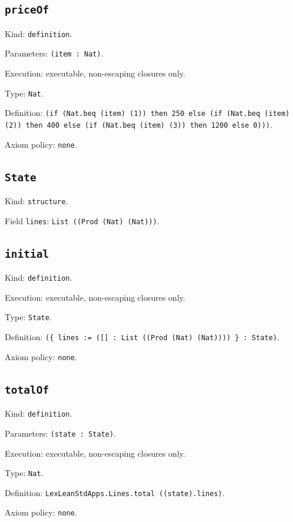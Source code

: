 \documentclass[11pt]{article}
\begin{document}
\subsection*{\texttt{priceOf}}
\noindent Kind: \texttt{definition}.\par
\noindent Parameters: \texttt{(item : Nat)}.\par
\noindent Execution: executable, non-escaping closures only.\par
\noindent Type: \texttt{Nat}.\par
\noindent Definition: \texttt{(if (Nat.beq (item) (1)) then 250 else (if (Nat.beq (item) (2)) then 400 else (if (Nat.beq (item) (3)) then 1200 else 0)))}.\par
\noindent Axiom policy: \texttt{none}.\par
\subsection*{\texttt{State}}
\noindent Kind: \texttt{structure}.\par
\noindent Field \texttt{lines}: \texttt{List ((Prod (Nat) (Nat)))}.\par
\subsection*{\texttt{initial}}
\noindent Kind: \texttt{definition}.\par
\noindent Execution: executable, non-escaping closures only.\par
\noindent Type: \texttt{State}.\par
\noindent Definition: \texttt{(\{ lines := ([] : List ((Prod (Nat) (Nat)))) \} : State)}.\par
\noindent Axiom policy: \texttt{none}.\par
\subsection*{\texttt{totalOf}}
\noindent Kind: \texttt{definition}.\par
\noindent Parameters: \texttt{(state : State)}.\par
\noindent Execution: executable, non-escaping closures only.\par
\noindent Type: \texttt{Nat}.\par
\noindent Definition: \texttt{LexLeanStdApps.Lines.total ((state).lines)}.\par
\noindent Axiom policy: \texttt{none}.\par
\end{document}

